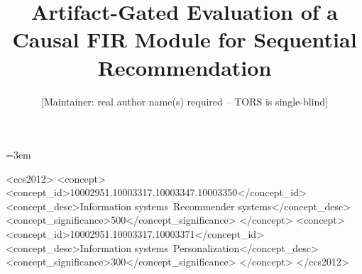 
\acmDOI{}%


\usepackage{tabularx}
\usepackage{longtable}
\setlength{\emergencystretch}{1.5em}

\graphicspath{{../figures/}}
\usepackage{cleveref}

\providecommand{\tightlist}{\setlength{\itemsep}{0pt}\setlength{\parskip}{0pt}}

\emergencystretch=3em



\title[Artifact-Gated Evaluation]{Artifact-Gated Evaluation of a Causal FIR Module for Sequential Recommendation}

\author{[Maintainer: real author name(s) required -- TORS is single-blind]}

\renewcommand{\shortauthors}{[Maintainer: short author list]}

\begin{abstract}

\end{abstract}

\begin{CCSXML}
<ccs2012>
<concept>
<concept_id>10002951.10003317.10003347.10003350</concept_id>
<concept_desc>Information systems~Recommender systems</concept_desc>
<concept_significance>500</concept_significance>
</concept>
<concept>
<concept_id>10002951.10003317.10003371</concept_id>
<concept_desc>Information systems~Personalization</concept_desc>
<concept_significance>300</concept_significance>
</concept>
</ccs2012>
\end{CCSXML}

